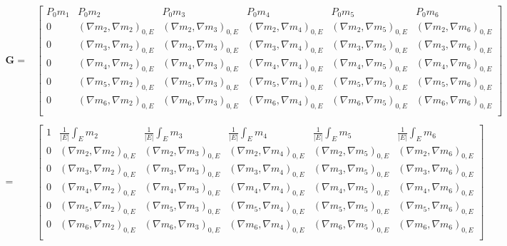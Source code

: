 \begin{equation*}
\begin{aligned}
\mathbf G = &
\begin{bmatrix}
P_0 m_1 & P_0m_2 &  P_0 m_{3} & P_0m_4 & P_0m_5 & P_0m_6 \\
0 & (\nabla m_2, \nabla m_2)_{0,E} & (\nabla m_2, \nabla m_{3})_{0,E}& (\nabla m_2, \nabla m_{4})_{0,E} & (\nabla m_2, \nabla m_{5})_{0,E} & (\nabla m_2, \nabla m_{6})_{0,E}\\
0 & (\nabla m_{3}, \nabla m_2)_{0,E} & (\nabla m_{3}, \nabla m_{3})_{0,E} & (\nabla m_{3}, \nabla m_{4})_{0,E} & (\nabla m_{3}, \nabla m_{5})_{0,E} & (\nabla m_{3}, \nabla m_{6})_{0,E}\\
0 & (\nabla m_4, \nabla m_2)_{0,E} & (\nabla m_4, \nabla m_{3})_{0,E}& (\nabla m_4, \nabla m_{4})_{0,E} & (\nabla m_4, \nabla m_{5})_{0,E} & (\nabla m_4, \nabla m_{6})_{0,E}\\
0 & (\nabla m_5, \nabla m_2)_{0,E} & (\nabla m_5, \nabla m_{3})_{0,E}& (\nabla m_5, \nabla m_{4})_{0,E} & (\nabla m_5, \nabla m_{5})_{0,E} & (\nabla m_5, \nabla m_{6})_{0,E}\\
0 & (\nabla m_6, \nabla m_2)_{0,E} & (\nabla m_6, \nabla m_{3})_{0,E}& (\nabla m_6, \nabla m_{4})_{0,E} & (\nabla m_6, \nabla m_{5})_{0,E} & (\nabla m_6, \nabla m_{6})_{0,E}\\
\end{bmatrix}\\
\\
= &
\begin{bmatrix}
1 & \frac{1}{|E|}\int_E m_2 & \frac{1}{|E|}\int_E m_3 & \frac{1}{|E|}\int_E m_4 & \frac{1}{|E|}\int_E m_5 & \frac{1}{|E|}\int_E m_6\\
0 & (\nabla m_2, \nabla m_2)_{0,E} & (\nabla m_2, \nabla m_{3})_{0,E}& (\nabla m_2, \nabla m_{4})_{0,E} & (\nabla m_2, \nabla m_{5})_{0,E} & (\nabla m_2, \nabla m_{6})_{0,E}\\
0 & (\nabla m_{3}, \nabla m_2)_{0,E} & (\nabla m_{3}, \nabla m_{3})_{0,E} & (\nabla m_{3}, \nabla m_{4})_{0,E} & (\nabla m_{3}, \nabla m_{5})_{0,E} & (\nabla m_{3}, \nabla m_{6})_{0,E}\\
0 & (\nabla m_4, \nabla m_2)_{0,E} & (\nabla m_4, \nabla m_{3})_{0,E}& (\nabla m_4, \nabla m_{4})_{0,E} & (\nabla m_4, \nabla m_{5})_{0,E} & (\nabla m_4, \nabla m_{6})_{0,E}\\
0 & (\nabla m_5, \nabla m_2)_{0,E} & (\nabla m_5, \nabla m_{3})_{0,E}& (\nabla m_5, \nabla m_{4})_{0,E} & (\nabla m_5, \nabla m_{5})_{0,E} & (\nabla m_5, \nabla m_{6})_{0,E}\\
0 & (\nabla m_6, \nabla m_2)_{0,E} & (\nabla m_6, \nabla m_{3})_{0,E}& (\nabla m_6, \nabla m_{4})_{0,E} & (\nabla m_6, \nabla m_{5})_{0,E} & (\nabla m_6, \nabla m_{6})_{0,E}\\
\end{bmatrix}\\
\end{aligned}
\end{equation*}

